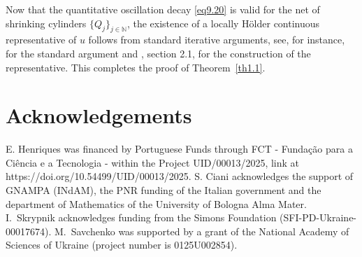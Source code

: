 \documentclass[a4paper,11pt,fullpage]{article}
\numberwithin{equation}{section}
\begin{document}
 \noindent Now that the quantitative oscillation decay  \eqref{eq9.20} is valid for the net of shrinking cylinders $\{Q_{j}\}_{j \in \mathbb{N}}$, the existence of a locally H\"{o}lder continuous representative of $u$ follows from standard iterative arguments, see, for instance, \cite[Chapters~3 and~4]{DiB1993} for the standard argument and \cite{CCMV}, section 2.1, for the construction of the representative. This completes the proof of Theorem~\ref{th1.1}.

\vspace{.5cm}

\section*{Acknowledgements}  E. Henriques was financed by Portuguese Funds through FCT - Funda\c c\~ao para a Ci\^encia e a Tecnologia - 
within the Project UID/00013/2025, link at https://doi.org/10.54499/UID/00013/2025. S. Ciani acknowledges the support of GNAMPA (INdAM), the PNR funding of the Italian government and the department of Mathematics of the University of Bologna Alma Mater. I.~Skrypnik acknowledges funding from the Simons Foundation (SFI-PD-Ukraine-00017674).  M.~Savchenko was supported  by a grant of the National Academy of Sciences of Ukraine (project number is 0125U002854). 
\end{document}
